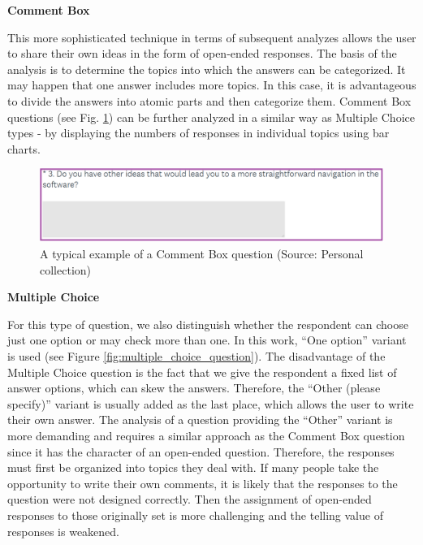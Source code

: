 \documentclass[a4paper,10pt,twoside]{article}
\begin{document}
\smallskip
\vspace*{-0.5cm}
\noindent \textbf {Comment Box}

\noindent This more sophisticated technique in terms of subsequent analyzes allows the user to share their own ideas in the form of open-ended responses. The basis of the analysis is to determine the topics into which the answers can be categorized. It may happen that one answer includes more topics. In this case, it is advantageous to divide the answers into atomic parts and then categorize them. Comment Box questions (see Fig. \ref{fig:comment_box_question}) can be further analyzed in a similar way as Multiple Choice types - by displaying the numbers of responses in individual topics using bar charts.

\vspace{0.3cm}
\begin{figure}[hbt!] 
\begin{center}
\includegraphics[width=15cm]{../pictures/comment_box_question.png} 
\caption[A typical example of a Comment Box question]{A typical example of a Comment Box question (Source: Personal collection)}
\label{fig:comment_box_question}
\end{center}
\end{figure}

\newpage
\vspace*{-1cm}
\bigskip
\noindent \textbf {Multiple Choice}

\noindent For this type of question, we also distinguish whether the respondent can choose just one option or may check more than one. In this work, ``One option'' variant is used (see Figure \ref{fig:multiple_choice_question}). The disadvantage of the Multiple Choice question is the fact that we give the respondent a fixed list of answer options, which can skew the answers. Therefore, the ``Other (please specify)'' variant is usually added as the last place, which allows the user to write their own answer. The analysis of a question providing the ``Other'' variant is more demanding and requires a similar approach as the Comment Box question since it has the character of an open-ended question. Therefore, the responses must first be organized into topics they deal with. If many people take the opportunity to write their own comments, it is likely that the responses to the question were not designed correctly. Then the assignment of open-ended responses to those originally set is more challenging and the telling value of responses is weakened.
\end{document}
